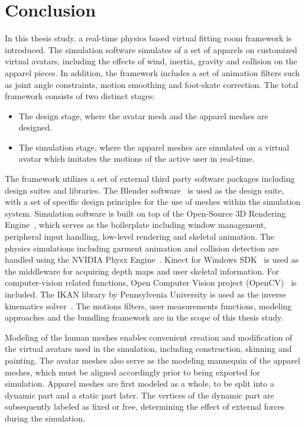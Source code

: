 \chapter{Conclusion}
\label{chapter_conclusion}

In this thesis study, a real-time physics based virtual fitting room framework is introduced. The simulation software simulates of a set of apparels on customized virtual avatars, including the effects of wind, inertia, gravity and collision on the apparel pieces. In addition, the framework includes a set of animation filters such as joint angle constraints, motion smoothing and foot-skate correction. The total framework consists of two distinct stages:

\begin{itemize}
  \item The design stage, where the avatar mesh and the apparel meshes are designed. 
  \item The simulation stage, where the apparel meshes are simulated on a virtual avatar which imitates the motions of the active user in real-time.   
\end{itemize}

The framework utilizes a set of external third party software packages including design suites and libraries. The Blender software~\cite{Blender} is used as the design suite, with a set of specific design principles for the use of meshes within the simulation system. Simulation software is built on top of the Open-Source 3D Rendering Engine~\cite{Knot2012}, which serves as the boilerplate including window management, peripheral input handling, low-level rendering and skeletal animation. The physics simulations including garment animation and collision detection are handled using the NVIDIA Physx Engine~\cite{WikiPhysx2012}. Kinect for Windows SDK~\cite{Microsoft2013} is used as the middleware for acquiring depth maps and user skeletal information. For computer-vision related functions, Open Computer Vision project (OpenCV)~\cite{opencv_library} is included. The IKAN library by Pennsylvenia University is used as the inverse kinematics solver~\cite{IKAN2013}. The motions filters, user measurements functions, modeling approaches and the bundling framework are in the scope of this thesis study. 

Modeling of the human meshes enables convenient creation and modification of the virtual avatars used in the simulation, including construction, skinning and painting. The avatar meshes also serve as the modeling mannequin of the apparel meshes, which must be aligned accordingly prior to being exported for simulation. Apparel meshes are first modeled as a whole, to be split into a dynamic part and a static part later. The vertices of the dynamic part are subsequently labeled as fixed or free, determining the effect of external forces during the simulation.

